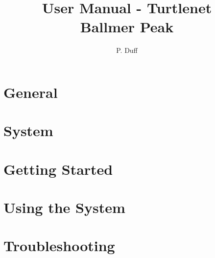 \documentclass[openany]{book}
\title{User Manual - Turtlenet\\Ballmer Peak}
\author{P. Duff}
\begin{document}
\maketitle
\tableofcontents

\chapter{General}


\chapter{System}


\chapter{Getting Started}


\chapter{Using the System}


\chapter{Troubleshooting}

\end{document}
